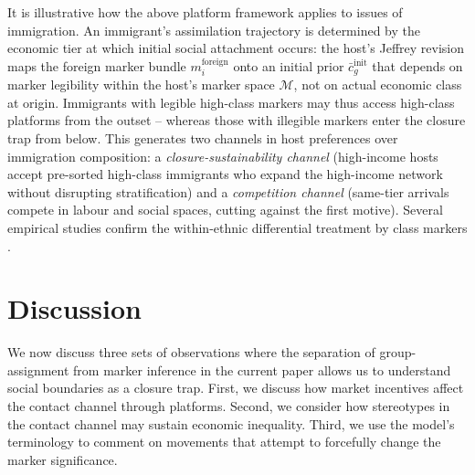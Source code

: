 \documentclass[pdflatex,sn-basic]{sn-jnl}
\newcommand{\M}{\mathcal{M}}
\theoremstyle{thmstyleone}
\numberwithin{proposition}{subsection}
\begin{document}
It is illustrative how the above platform framework applies to issues of immigration. An
immigrant's assimilation trajectory is determined by the economic
tier at which initial social attachment occurs: the host's Jeffrey
revision maps the foreign marker bundle $m_i^{\text{foreign}}$ onto
an initial prior $\bar{c}_g^{\text{init}}$ that depends on marker
legibility within the host's marker space $\M$, not on actual
economic class at origin. Immigrants with legible high-class markers may thus
access high-class platforms from the outset -- whereas those with illegible
markers enter the closure trap from below. This generates two channels in host preferences over
immigration composition: a \emph{closure-sustainability channel}
(high-income hosts accept pre-sorted high-class immigrants who expand
the high-income network without disrupting stratification) and a
\emph{competition channel} (same-tier arrivals compete in labour and
social spaces, cutting against the first motive). Several empirical studies confirm the within-ethnic differential treatment by class markers \citep{LeeZhou2015, Waters1999}.

\section{Discussion}
\label{sec:discussion}

We now discuss three sets of observations where the separation of group-assignment from marker inference in the current paper allows us to understand social boundaries as a closure trap. First, we discuss how market incentives affect the contact channel through platforms. Second, we consider how stereotypes in the contact channel may sustain economic inequality. Third, we use the model's terminology to comment on movements that attempt to forcefully change the marker significance.
\end{document}
